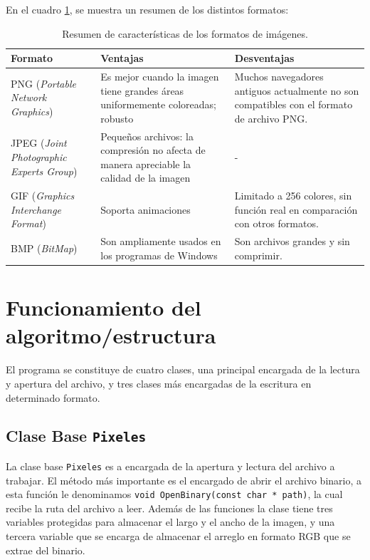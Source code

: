 En el cuadro \ref{T:T111}, se muestra un resumen de los distintos formatos: 

\begin{table}[H]
\begin{center}
    \begin{tabular}{ |>{\centering\arraybackslash}m{4cm}|>{\centering\arraybackslash}m{5.5cm}|>{\centering\arraybackslash}m{5.5cm}| }
    	\hline
    	\cellcolor{cl} \textbf{Formato} & \cellcolor{cl} \textbf{Ventajas} & \cellcolor{cl} \textbf{Desventajas}\\ \hline \hline
    	PNG (\textit{Portable Network Graphics}) & Es mejor cuando la imagen tiene grandes áreas uniformemente coloreadas; robusto& Muchos navegadores antiguos actualmente no son compatibles con el formato de archivo PNG. \\
    	\hline
    	JPEG (\textit{Joint Photographic Experts Group}) & Pequeños archivos: la compresión no afecta de manera apreciable la calidad de la imagen & - \\
    	\hline
    	GIF (\textit{Graphics Interchange Format}) & Soporta animaciones & Limitado a 256 colores, sin función real en comparación con otros formatos.\\
    	\hline
    	BMP (\textit{BitMap}) &Son ampliamente usados en los programas de Windows&Son archivos grandes y sin comprimir.\\
    	\hline
    \end{tabular}
\end{center}
\label{T:T111}
\caption{Resumen de características de los formatos de imágenes. \cite{R1}}
\end{table}


\section{Funcionamiento del algoritmo/estructura}
El programa se constituye de cuatro clases, una principal encargada de la lectura y apertura del archivo, y tres clases más encargadas de la escritura en determinado formato.
\subsection{Clase Base \texttt{Pixeles}}
La clase base \texttt{Pixeles} es a encargada de la apertura y lectura del archivo a trabajar. El método más importante es el encargado de abrir el archivo binario, a esta función le denominamos \texttt{void OpenBinary(const char * path)}, la cual recibe la ruta del archivo a leer. Además de las funciones la clase tiene tres variables protegidas para almacenar el largo y el ancho de la imagen, y una tercera variable que se encarga de almacenar el arreglo en formato RGB que se extrae del binario.

